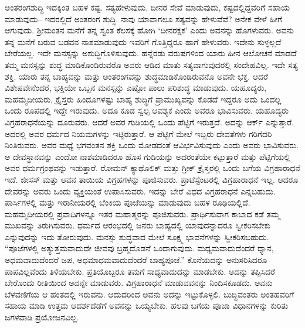 ಅಂತರಂಗಶುದ್ಧಿ ಇದಕ್ಕಿಂತ ಬಹಳ ಕಷ್ಟ. ಸತ್ಯಹೇಳುವುದು, ದೀನರ ಸೇವೆ ಮಾಡುವುದು, ಕಷ್ಟದಲ್ಲಿದ್ದವರಿಗೆ ಸಹಾಯ ಮಾಡುವುದು– ಇದರಲ್ಲಿದೆ ಅಂತರಂಗ ಶುದ್ಧಿ. ನಾವು ಯಾವಾಗಲೂ ಸತ್ಯವನ್ನು ಹೇಳುವೆವೆ? ಅನೇಕ ವೇಳೆ ಹೀಗೆ ಆಗುವುದು. ಶ‍್ರೀಮಂತನ ಮನೆಗೆ ತನ್ನ ಸ್ವಂತ ಕೆಲಸಕ್ಕೆ ಹೋಗಿ ‘ದೀನರಕ್ಷಕ’ ಎಂದು ಅವನನ್ನು ಹೊಗಳುವರು. ಅವನು ತನ್ನ ಮನೆಗೆ ಬರುವ ಬಡವನ ನಾಶಮಾಡುವುದು ಇವರಿಗೆ ಗೊತ್ತಿದ್ದರೂ ಹಾಗೆ ಹೇಳುವರು. ಇದೇನು ಸುಳ್ಳಲ್ಲದೆ ಬೇರೆಯಲ್ಲ. ಇದೇ ಮನಸ್ಸನ್ನು ಅಶುದ್ಧಿಗೊಳಿಸುವುದು. ಹನ್ನೆರಡು ವರುಷಗಳಿಂದ ಯಾರು ಹೀನ ಆಲೋಚನೆ ಮಾಡದೆ ತಮ್ಮ ಮನಸ್ಸನ್ನು ಶುದ್ಧ ಮಾಡಿಕೊಂಡಿರುವರೊ ಅವರು ಆಡಿದ ಮಾತು ಸತ್ಯವಾಗುವುದರಲ್ಲಿ ಸಂದೇಹವಿಲ್ಲ. ಇದೇ ಸತ್ಯ ಶಕ್ತಿ. ಯಾರು ತನ್ನ ಬಾಹ್ಯವನ್ನು ಮತ್ತು ಅಂತರಂಗವನ್ನು ಶುದ್ಧಮಾಡಿಕೊಂಡಿರುವನೊ ಅವನೇ ಭಕ್ತ. ಆದರೆ ವಿಶೇಷವೇನೆಂದರೆ, ಭಕ್ತಿಯೇ ಒಬ್ಬನ ಮನಸ್ಸನ್ನು ಎಷ್ಟೋ ಪಾಲು ಪರಿಶುದ್ಧ ಮಾಡುವುದು. ಯಹೂದ್ಯರು, ಮಹಮ್ಮದೀಯರು, ಕ್ರೈಸ್ತರು ಹಿಂದೂಗಳಷ್ಟು ಬಾಹ್ಯ ಶುದ್ಧಿಗೆ ಪ್ರಾಮುಖ್ಯವನ್ನು ಕೊಡದೆ ಇದ್ದರೂ ಅದು ಒಂದಲ್ಲ ಒಂದು ರೂಪದಲ್ಲಿ ಇದ್ದೇ ಇರುವುದು. ಅದೂ ಕೂಡ ಸ್ವಲ್ಪ ಆವಶ್ಯಕ ಎಂದು ಅವರೂ ಭಾವಿಸುವರು. ಯಹೂದ್ಯರು ವಿಗ್ರಹರಾಧನೆಯನ್ನು ದೂರುವರು. ಆದರೆ ಅವರ ಗುಡಿಯಲ್ಲಿ ಒಂದು ಪೆಟ್ಟಿಗೆ ಇರುತ್ತದೆ. ಅದನ್ನು ಆರ್ಕ್​ ಎನ್ನುತ್ತಾರೆ. ಅದರಲ್ಲಿ ಅವರ ಧರ್ಮದ ನಿಯಮಗಳನ್ನು ಇಟ್ಟಿರುತ್ತಾರೆ. ಆ ಪೆಟ್ಟಿಗೆ ಮೇಲೆ ಇಬ್ಬರು ದೇವತೆಗಳು ಗರಿಗೆದರಿ ನಿಂತಿರುವರು. ಅವರ ಮಧ್ಯೆ ಭಗವಂತನ ಶಕ್ತಿ ಒಂದು ಮೋಡದಂತೆ ಆವಿರ್ಭವಿಸುವುದು ಎಂದು ಅವರು ಭಾವಿಸುವರು. ಆ ದೇವಸ್ಥಾನವನ್ನು ಎಂದೋ ನಾಶಮಾಡಿದರೂ ಹೊಸ ಗುಡಿಯನ್ನು ಅದರಂತೆಯೇ ಕಟ್ಟುತ್ತಾರೆ ಮತ್ತು ಪೆಟ್ಟಿಗೆಯಲ್ಲಿ ಅವರ ಧರ್ಮಗ್ರಂಥವನ್ನು ಇಡುತ್ತಾರೆ. ರೋಮನ್​ ಕ್ಯಾಥೊಲಿಕ್​ ಮತ್ತು ಗ್ರೀಕ್​ ಕ್ರೈಸ್ತರಲ್ಲಿ ಒಂದು ಬಗೆಯ ವಿಗ್ರಹಾರಾಧನೆ ಇದೆ. ಜೀಸಸ್​ ಮತ್ತು ಆವನ ತಾಯಿಯ ವಿಗ್ರಹಗಳನ್ನು ಪೂಜಿಸುವರು. ಪ್ರಾಟೆಸ್ಟೆಂಟರಲ್ಲಿ ವಿಗ್ರಹಾರಾಧನೆ ಇಲ್ಲ. ಆದರೂ ದೇವರನ್ನು ಅವರು ಒಂದು ವ್ಯಕ್ತಿಯಂತೆ ಉಪಾಸಿಸುವರು. ಇದನ್ನು ಬೇರೆ ವಿಧದ ವಿಗ್ರಹರಾಧನೆ ಎನ್ನಬಹುದು. ಪಾರ್ಸಿಗಳಲ್ಲಿ ಮತ್ತು ಇರಾನೀಯರಲ್ಲಿ ಬೆಂಕಿಯ ಪೂಜೆಯನ್ನು ಮಾಡುವುದು ಬಹಳ ರೂಢಿಯಲ್ಲಿದೆ. ಮಹಮ್ಮದೀಯರಲ್ಲಿ ಪ್ರವಾದಿಗಳನ್ನೂ ಇತರ ಮಹಾತ್ಮರನ್ನು ಪೂಜಿಸುವರು. ಪ್ರಾರ್ಥಿಸುವಾಗ ಕಾಬಾದ ಕಡೆ ತಮ್ಮ ಮುಖವನ್ನು ತಿರುಗಿಸುವರು. ಧರ್ಮದ ಆರಂಭದಲ್ಲಿ ಜನರು ಬಾಹ್ಯದಲ್ಲಿ ಯಾವುದನ್ನಾದರೂ ಸ್ವೀಕರಿಸಬೇಕು ಎನ್ನುವುದನ್ನು ಇದು ತೋರುವುದು. ಮನಸ್ಸು ಶುದ್ಧವಾದ ಮೇಲೆ ಸೂಕ್ಷ್ಮ ಭಾವನೆಗಳನ್ನು ಸ್ವೀಕರಿಸಬಹುದು. “ಪೂಜೆಗಳಲ್ಲಿ ಅತ್ಯುತ್ತಮವಾದುದೇ ಜೀವವು ಬ್ರಹ್ಮದೊಡನೆ ಒಂದಾಗುವುದು. ಮಧ್ಯಮವಾದುದೆಂದರೆ ಧ್ಯಾನ, ಅಧಮವಾದುದೆಂದರೆ ಜಪ, ಅಧಮಾಧಮವಾದುದೆಂದರೆ ಬಾಹ್ಯಪೂಜೆ.” ಕೊನೆಯದನ್ನು ಅನುಸರಿಸಿದರೂ ಪಾಪವಿಲ್ಲವೆಂದು ತಿಳಿಯಬೇಕು. ಪ್ರತಿಯೊಬ್ಬರೂ ತಮಗೆ ಸಾಧ್ಯವಾದುದನ್ನು ಮಾಡಬೇಕು. ಅದನ್ನು ತಪ್ಪಿಸಿದರೆ ಬೇರೊಂದು ರೀತಿಯಿಂದ ಅದನ್ನೇ ಮಾಡುವರು. ವಿಗ್ರಹಾರಾಧನೆ ಮಾಡುವವನನ್ನು ನಿಂದಿಸಕೂಡದು. ಅವನು ಬೆಳವಣಿಗೆಯ ಆ ಹಂತದಲ್ಲಿ ಇರುವನು. ಆದುದರಿಂದ ಅವನು ಅದನ್ನು ಇಟ್ಟುಕೊಳ್ಳಲಿ. ಬುದ್ಧಿವಂತರು ಅಂತಹವರಿಗೆ ಸಹಾಯ ಮಾಡಿ ಉತ್ತಮ ಆದರ್ಶದೆಡೆಗೆ ಅವನನ್ನು ಒಯ್ಯಬೇಕು. ಹಲವು ಬಗೆಯ ಪೂಜಾ ವಿಧಾನಗಳನ್ನು ಕುರಿತು ಜಗಳವಾಡಿ ಪ್ರಯೋಜನವಿಲ್ಲ.

\vskip 0.2cm

